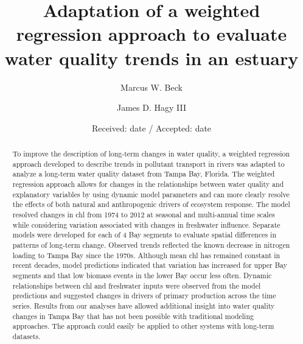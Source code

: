 \documentclass{svjour3}\usepackage[]{graphicx}\usepackage[]{color}
\begin{document}
\title{Adaptation of a weighted regression approach to evaluate water quality trends in an estuary
}


\author{Marcus W. Beck       \and
        James D. Hagy III
}


\date{Received: date / Accepted: date}

\maketitle

\begin{abstract}
To improve the description of long-term changes in water quality, a weighted regression approach developed to describe trends in pollutant transport in rivers was adapted to analyze a long-term water quality dataset from Tampa Bay, Florida.  The weighted regression approach allows for changes in the relationships between water quality and explanatory variables by using dynamic model parameters and can more clearly resolve the effects of both natural and anthropogenic drivers of ecosystem response.  The model resolved changes in \ac{chl} from 1974 to 2012 at seasonal and multi-annual time scales while considering variation associated with changes in freshwater influence.  Separate models were developed for each of 4 Bay segments to evaluate spatial differences in patterns of long-term change.  Observed trends reflected the known decrease in nitrogen loading to Tampa Bay since the 1970s. Although mean \ac{chl} has remained constant in recent decades, model predictions indicated that variation has increased for upper Bay segments and that low biomass events in the lower Bay occur less often. Dynamic relationships between \ac{chl} and freshwater inputs were observed from the model predictions and suggested changes in drivers of primary production across the time series.  Results from our analyses have allowed additional insight into water quality changes in Tampa Bay that has not been possible with traditional modeling approaches. The approach could easily be applied to other systems with long-term datasets.
\end{abstract}
\end{document}
